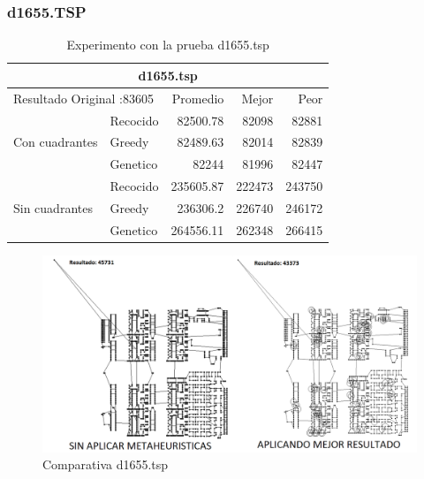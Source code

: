 \subsubsection{d1655.TSP}
\begin{table}[hbtp]
 \centering 
	\begin{tabular}{ | l   l | r | r | r |   }
         \hline\multicolumn{5}{|c|}{ \rowcolor[gray]{0.8}d1655.tsp    } \\\hline
         \multicolumn{2}{|l|}{Resultado Original :83605}  & Promedio & Mejor & Peor \\ \hline
                        & Recocido  & 82500.78 & 82098 & 82881  \\ 
         Con cuadrantes & Greedy    & 82489.63 & 82014 & 82839  \\ 
                        & Genetico  & 82244 & 81996 & 82447  \\ \hline
                        & Recocido  & 235605.87 & 222473 & 243750   \\ 
         Sin cuadrantes & Greedy    & 236306.2 & 226740 & 246172   \\ 
                        & Genetico  & 264556.11 & 262348 & 266415   \\ \hline
    \end{tabular}
    \caption{Experimento con la prueba d1655.tsp}
    \label{table:EXP_d1655.tsp}
\end{table}
\begin{figure}[hbtp]
    \centering
        \includegraphics[width=1\textwidth]{PruebasResultados/Experimentos_Comparativas/d1655.png}
        \caption{Comparativa d1655.tsp}
        \label{fig:d1655_comparativa.png}
\end{figure}
